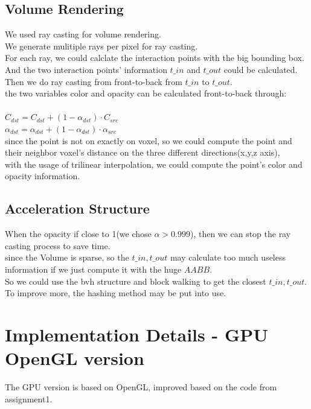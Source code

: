 \documentclass[acmtog]{acmart}
\begin{document}
\subsection{Volume Rendering}
We used ray casting for volume rendering.\\
We generate mulitiple rays per pixel for ray casting.\\
For each ray, we could calclate the interaction points with the big bounding box.\\
And the two interaction points' information $t\_in$ and $t\_out$ could be calculated.\\
Then we do ray casting from front-to-back from $t\_in$ to $t\_out$.\\
the two variables color and opacity can be calculated front-to-back through:\\\\
$C_{dst} = C_{dst} + (1 - \alpha_{dst}) \cdot C_{src}$\\
$\alpha_{dst} = \alpha_{dst} + (1 - \alpha_{dst}) \cdot \alpha_{src}$\\

since the point is not on exactly on voxel, so we could compute the point and their neighbor voxel's distance on
the three different directions(x,y,z axis),\\

with the usage of trilinear interpolation, we could compute the point's color and opacity information.\\


\subsection{Acceleration Structure}
When the opacity if close to 1(we chose $\alpha > 0.999$),
then we can stop the ray casting process to save time.\\
since the Volume is sparse, so the $t\_in, t\_out$ may calculate too much useless 
information if we just compute it with the huge $AABB$.\\
So we could use the bvh structure and block walking to get the closest $t\_in, t\_out$.\\
To improve more, the hashing method may be put into use.\\

\section{Implementation Details - GPU OpenGL version}
The GPU version is based on OpenGL, improved based on the code from assignment1.
\end{document}

